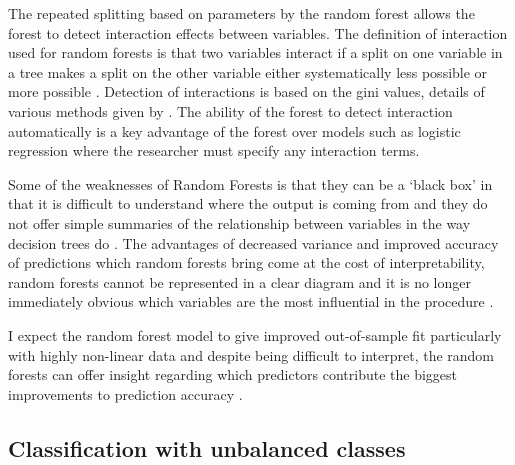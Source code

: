 \documentclass[11pt,a4paper]{article}
\begin{document}
The repeated splitting based on parameters by the random forest allows the forest to detect interaction effects between variables. The definition of interaction used for random forests is that two variables interact if a split on one variable in a tree makes a split on the other variable either systematically less possible or more possible \citep{breiman01}. Detection of interactions is based on the gini values,  details of various methods given by \citet{kelly12}. The ability of the forest to detect interaction automatically is a key advantage of the forest over models such as logistic regression where the researcher must specify any interaction terms. 

Some of the weaknesses of Random Forests is that they can be a ‘black box’ in that it is difficult to understand where the output is coming from and they do not offer simple summaries of the relationship between variables in the way decision trees do \citep{varian14}. The advantages of decreased variance and improved accuracy of predictions which random forests bring come at the cost of interpretability, random forests cannot be represented in a clear diagram and it is no longer immediately obvious which variables are the most influential in the procedure \citep{james13}. 

I expect the random forest model to give improved out-of-sample fit particularly with highly non-linear data and despite being difficult to interpret, the random forests can offer insight regarding which predictors contribute the biggest improvements to prediction accuracy \citep{varian14}.


\subsection{Classification with unbalanced classes}
\end{document}
